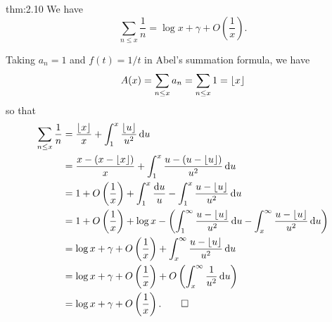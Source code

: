 \begin{theo}{thm:2.10}
We have 
\[ \sum_{n \leq x} \frac1n = \log x + \gamma + O
\left( \frac1x \right). \]
\end{theo}
\begin{pf}
Taking $a_n = 1$ and $f(t) = 1/t$ in Abel's summation formula,
we have 
\[ A(x) = \sum_{n\leq x} a_n = \sum_{n \leq x} 1 = \lfloor x\rfloor \]
so that 
\begin{align*}
    \sum_{n\leq x} \frac1n &= \frac{\lfloor x\rfloor}{x} + \int_1^x \frac{\lfloor u\rfloor}{u^2}\,\mathrm{d} u \\
    &= \frac{x - (x - \lfloor x\rfloor)}{x} + \int_1^x \frac{u - (u - \lfloor u\rfloor)}{u^2}\,\mathrm{d} u \\
    &= 1 + O\left(\frac1x\right) + \int_1^x \frac{{\rm d}u}u -
    \int_1^x \frac{u - \lfloor u\rfloor}{u^2}\,\mathrm{d} u \\
    &= 1 + O\left(\frac1x\right) + \log x - \left( \int_1^\infty \frac{u-\lfloor u\rfloor}{u^2}\,\mathrm{d} u - \int_x^\infty \frac{u-\lfloor u\rfloor}{u^2}\,\mathrm{d} u \right) \\
    &= \log x + \gamma + O\left(\frac1x\right) + 
    \int_x^\infty \frac{u-\lfloor u\rfloor}{u^2}\,\mathrm{d} u \\
    &= \log x + \gamma + O\left(\frac1x\right) 
    + O\left(\int_x^\infty \frac1{u^2}\,\mathrm{d} u \right) \\
    &= \log x + \gamma + O\left(\frac1x\right). \qedhere
\end{align*}
\end{pf}

